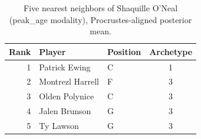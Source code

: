 \begin{table}[htbp]
  \centering\small
  \begin{tabular}{rllc}
    \toprule
    Rank & Player & Position & Archetype \\
    \midrule
    1 & Patrick Ewing & C & 1 \\
    2 & Montrezl Harrell & F & 3 \\
    3 & Olden Polynice & C & 3 \\
    4 & Jalen Brunson & G & 3 \\
    5 & Ty Lawson & G & 3 \\
    \bottomrule
  \end{tabular}
  \caption{Five nearest neighbors of Shaquille O'Neal (peak_age modality), Procrustes-aligned posterior mean.}
  \label{tab:Shaquille_O_Neal_neighbors_peak_age}
\end{table}

